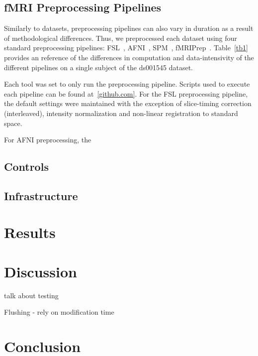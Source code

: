 \documentclass[10pt,journal,compsoc]{IEEEtran}
\begin{document}

\subsection{fMRI Preprocessing Pipelines}

Similarly to datasets, preprocessing pipelines can also vary in duration as a result of methodological differences.
Thus, we preprocessed each dataset using four standard preprocessing pipelines: FSL~\cite{fsl}, AFNI~\cite{AFNI},
SPM~\cite{SPM}, fMRIPrep~\cite{fmriprep}. Table~\ref{tb1} provides an reference of the differences in computation and data-intensivity
of the different pipelines on a single subject of the ds001545 dataset.

Each tool was set to only run the preprocessing pipeline. Scripts used to execute each pipeline can be found at~\ref{github.com}.
For the FSL preprocessing pipeline, the default settings were maintained with the exception of slice-timing correction (interleaved),
intensity normalization and non-linear registration to standard space.


For AFNI preprocessing, the 




\subsection{Controls}
\subsection{Infrastructure}

\section{Results}


\section{Discussion}
talk about testing


Flushing - rely on modification time
\section{Conclusion}
%
\end{document}

